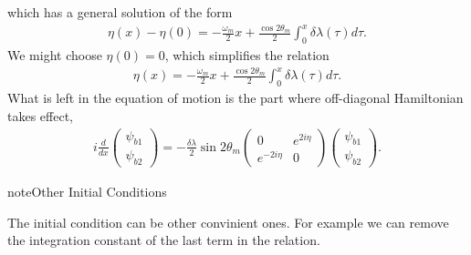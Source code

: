 \documentclass[letterpaper,12pt,english]{sphinxmanual}
\begin{document}
which has a general solution of the form
\label{\detokenize{matter-stimulated/index:matter-stimulated-equation-eta-x-general}}\label{\detokenize{matter-stimulated/index:equation-eta-x-general}}\begin{equation}\label{equation:matter-stimulated/index:eta-x-general}
\begin{split}\eta(x) - \eta(0) = - \frac{\omega_m}{2} x + \frac{\cos 2\theta_m}{2} \int_0^x \delta\lambda (\tau) d\tau.\end{split}
\end{equation}
We might choose \(\eta(0)=0\), which simplifies the relation
\begin{equation*}
\begin{split}\eta(x)= - \frac{\omega_m}{2} x + \frac{\cos 2\theta_m}{2} \int_0^x \delta\lambda (\tau) d\tau.\end{split}
\end{equation*}
What is left in the equation of motion is the part where off-diagonal Hamiltonian takes effect,
\begin{equation*}
\begin{split}i \frac{d}{dx} \begin{pmatrix} \psi_{b1} \\ \psi_{b2} \end{pmatrix} = - \frac{\delta \lambda}{2} \sin 2\theta_m \begin{pmatrix} 0 & e^{2i\eta} \\ e^{-2 i\eta } & 0 \end{pmatrix}  \begin{pmatrix} \psi_{b1} \\ \psi_{b2} \end{pmatrix}.\end{split}
\end{equation*}
\begin{sphinxadmonition}{note}{Other Initial Conditions}

The initial condition can be other convinient ones. For example we can remove the integration constant of the last term in the relation.
\end{sphinxadmonition}
\end{document}
